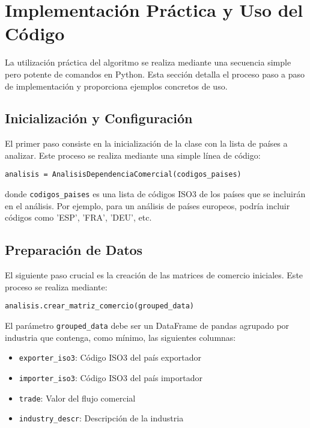 \documentclass[authoryear]{elsarticle}
\begin{document}
\section{Implementación Práctica y Uso del Código}

La utilización práctica del algoritmo se realiza mediante una secuencia simple pero potente de comandos en Python. Esta sección detalla el proceso paso a paso de implementación y proporciona ejemplos concretos de uso.

\subsection{Inicialización y Configuración}

El primer paso consiste en la inicialización de la clase con la lista de países a analizar. Este proceso se realiza mediante una simple línea de código:

\begin{verbatim}
analisis = AnalisisDependenciaComercial(codigos_paises)
\end{verbatim}

donde \texttt{codigos\_paises} es una lista de códigos ISO3 de los países que se incluirán en el análisis. Por ejemplo, para un análisis de países europeos, podría incluir códigos como 'ESP', 'FRA', 'DEU', etc.

\subsection{Preparación de Datos}

El siguiente paso crucial es la creación de las matrices de comercio iniciales. Este proceso se realiza mediante:

\begin{verbatim}
analisis.crear_matriz_comercio(grouped_data)
\end{verbatim}

El parámetro \texttt{grouped\_data} debe ser un DataFrame de pandas agrupado por industria que contenga, como mínimo, las siguientes columnas:
\begin{itemize}
    \item \texttt{exporter\_iso3}: Código ISO3 del país exportador
    \item \texttt{importer\_iso3}: Código ISO3 del país importador
    \item \texttt{trade}: Valor del flujo comercial
    \item \texttt{industry\_descr}: Descripción de la industria
\end{itemize}
\end{document}

